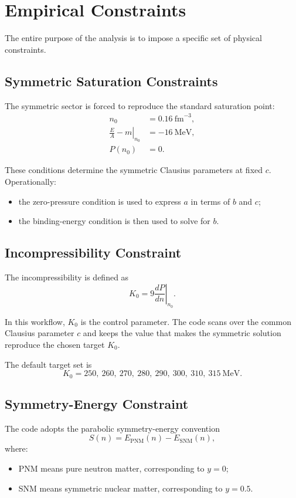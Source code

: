 \documentclass[11pt]{article}
\begin{document}
\section{Empirical Constraints}

The entire purpose of the analysis is to impose a specific set of physical
constraints.

\subsection{Symmetric Saturation Constraints}

The symmetric sector is forced to reproduce the standard saturation point:
\begin{align}
n_0 &= 0.16 \ \mathrm{fm}^{-3}, \\
\left.\frac{E}{A} - m\right|_{n_0} &= -16 \ \mathrm{MeV}, \\
P(n_0) &= 0.
\end{align}

These conditions determine the symmetric Clausius parameters at fixed $c$.
Operationally:
\begin{itemize}
\item the zero-pressure condition is used to express $a$ in terms of $b$ and
$c$;
\item the binding-energy condition is then used to solve for $b$.
\end{itemize}

\subsection{Incompressibility Constraint}

The incompressibility is defined as
\begin{equation}
K_0 = 9 \left.\frac{dP}{dn}\right|_{n_0}.
\end{equation}

In this workflow, $K_0$ is the control parameter. The code scans over the
common Clausius parameter $c$ and keeps the value that makes the symmetric
solution reproduce the chosen target $K_0$.

The default target set is
\[
K_0 = 250,\ 260,\ 270,\ 280,\ 290,\ 300,\ 310,\ 315 \ \mathrm{MeV}.
\]

\subsection{Symmetry-Energy Constraint}

The code adopts the parabolic symmetry-energy convention
\begin{equation}
S(n) = E_{\mathrm{PNM}}(n) - E_{\mathrm{SNM}}(n),
\end{equation}
where:
\begin{itemize}
\item PNM means pure neutron matter, corresponding to $y=0$;
\item SNM means symmetric nuclear matter, corresponding to $y=0.5$.
\end{itemize}
\end{document}
